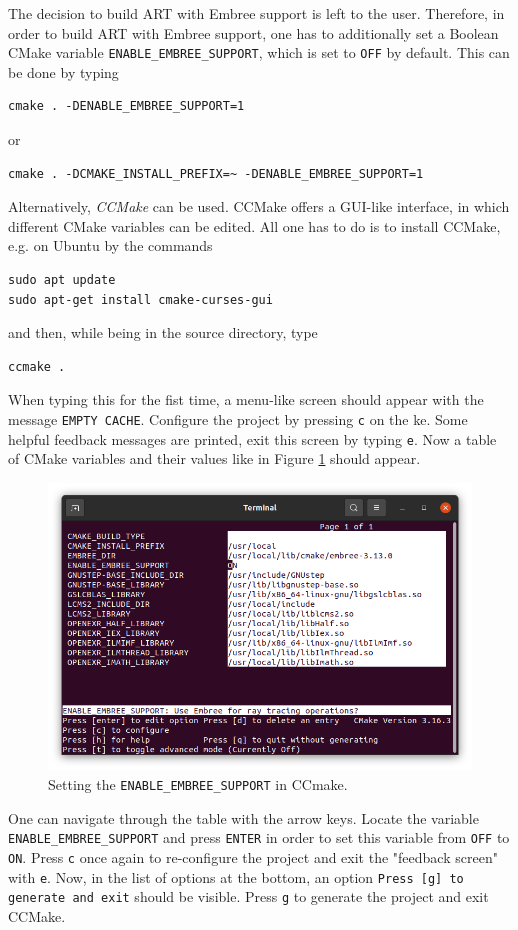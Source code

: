 \begin{enumerate}
	 The decision to build ART with Embree support is left to the user. Therefore, in order to build ART with Embree support, one has to additionally set a Boolean CMake variable \texttt{ENABLE\_EMBREE\_SUPPORT}, which is set to \texttt{OFF} by default. This can be done by typing
\begin{Verbatim}
cmake . -DENABLE_EMBREE_SUPPORT=1 
\end{Verbatim}
	or
\begin{Verbatim}
cmake . -DCMAKE_INSTALL_PREFIX=~ -DENABLE_EMBREE_SUPPORT=1 
\end{Verbatim}
	Alternatively, \emph{CCMake} can be used. CCMake offers a GUI-like interface, in which different CMake variables can be edited. All one has to do is to install CCMake, e.g. on Ubuntu by the commands 
\begin{Verbatim}
sudo apt update
sudo apt-get install cmake-curses-gui
\end{Verbatim}
	and then, while being in the source directory, type
\begin{Verbatim}
ccmake .
\end{Verbatim}
	When typing this for the fist time, a menu-like screen should appear with the message \texttt{EMPTY CACHE}. Configure the project by pressing \texttt{c} on the ke. 
	Some helpful feedback messages are printed, exit this screen by typing \texttt{e}. Now a table of CMake variables and their values like in Figure \ref{fig:ccmake} should appear.
	\begin{figure}[h]
		\centering
		\includegraphics[width=.8\linewidth]{img/appendix/ccmake.png}
		\caption{Setting the \texttt{ENABLE\_EMBREE\_SUPPORT} in CCmake.}
		\label{fig:ccmake}
	\end{figure}
	 One can navigate through the table with the arrow keys. Locate the variable \texttt{ENABLE\_EMBREE\_SUPPORT} and press \texttt{ENTER} in order to set this variable from \texttt{OFF} to \texttt{ON}. Press \texttt{c} once again to re-configure the project and exit the "feedback screen" with \texttt{e}. Now, in the list of options at the bottom, an option \texttt{Press [g] to generate and exit} should be visible. Press \texttt{g} to generate the project and exit CCMake. 
	 

\end{enumerate}
